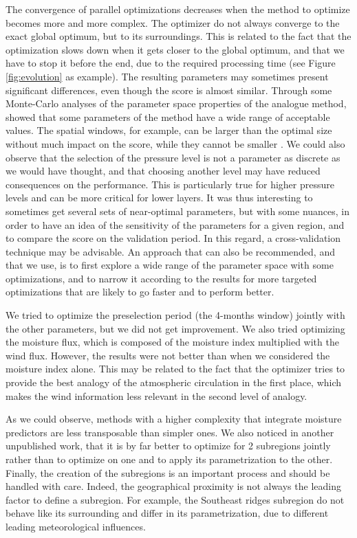 \documentclass[twocol]{ametsoc}
\begin{document}
The convergence of parallel optimizations decreases when the method to optimize becomes more and more complex. The optimizer do not always converge to the exact global optimum, but to its surroundings. This is related to the fact that the optimization slows down when it gets closer to the global optimum, and that we have to stop it before the end, due to the required processing time (see Figure \ref{fig:evolution} as example). The resulting parameters may sometimes present significant differences, even though the score is almost similar. Through some Monte-Carlo analyses of the parameter space properties of the analogue method, \citet{Horton2012a} showed that some parameters of the method have a wide range of acceptable values. The spatial windows, for example, can be larger than the optimal size without much impact on the score, while they cannot be smaller \citep[see also][]{Bontron2004}. We could also observe that the selection of the pressure level is not a parameter as discrete as we would have thought, and that choosing another level may have reduced consequences on the performance. This is particularly true for higher pressure levels and can be more critical for lower layers. It was thus interesting to sometimes get several sets of near-optimal parameters, but with some nuances, in order to have an idea of the sensitivity of the parameters for a given region, and to compare the score on the validation period. In this regard, a cross-validation technique may be advisable. An approach that can also be recommended, and that we use, is to first explore a wide range of the parameter space with some optimizations, and to narrow it according to the results for more targeted optimizations that are likely to go faster and to perform better.

We tried to optimize the preselection period (the 4-months window) jointly with the other parameters, but we did not get improvement. We also tried optimizing the moisture flux, which is composed of the moisture index multiplied with the wind flux. However, the results were not better than when we considered the moisture index alone. This may be related to the fact that the optimizer tries to provide the best analogy of the atmospheric circulation in the first place, which makes the wind information less relevant in the second level of analogy.

As we could observe, methods with a higher complexity that integrate moisture predictors are less transposable than simpler ones. We also noticed in another unpublished work, that it is by far better to optimize for 2 subregions jointly rather than to optimize on one and to apply its parametrization to the other. Finally, the creation of the subregions is an important process and should be handled with care. Indeed, the geographical proximity is not always the leading factor to define a subregion. For example, the Southeast ridges subregion do not behave like its surrounding and differ in its parametrization, due to different leading meteorological influences.
\end{document}

